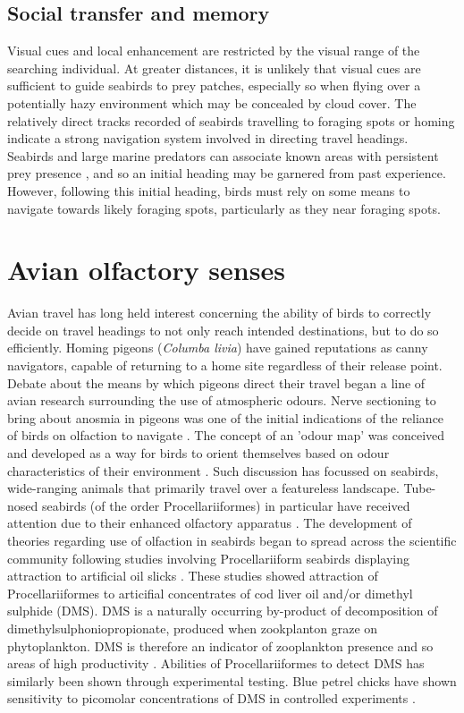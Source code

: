 \documentclass[9pt,twocolumn,twoside,lineno]{pnas-new}
\begin{document}
\subsection{Social transfer and memory}
Visual cues and local enhancement are restricted by the visual range of the searching individual. At greater distances, it is unlikely that visual cues are sufficient to guide seabirds to prey patches, especially so when flying over a potentially hazy environment which may be concealed by cloud cover. The relatively direct tracks recorded of seabirds travelling to foraging spots or homing \citep{Weimerskirch_2007b,Pollonara_2015} indicate a strong navigation system involved in directing travel headings. Seabirds and large marine predators can associate known areas with persistent prey presence \citep{Davoren_2013}, and so an initial heading may be garnered from past experience. However, following this initial heading, birds must rely on some means to navigate towards likely foraging spots, particularly as they near foraging spots.

\section{Avian olfactory senses}
Avian travel has long held interest concerning the ability of birds to correctly decide on travel headings to not only reach intended destinations, but to do so efficiently. Homing pigeons (\textit{Columba livia}) have gained reputations as canny navigators, capable of returning to a home site regardless of their release point. Debate about the means by which pigeons direct their travel began a line of avian research surrounding the use of atmospheric odours. Nerve sectioning to bring about anosmia in pigeons was one of the initial indications of the reliance of birds on olfaction to navigate \citep{Papi_1972}. The concept of an 'odour map' was conceived and developed as a way for birds to orient themselves based on odour characteristics of their environment \citep{Papi_1972,Bonadonna_2003}. Such discussion has focussed on seabirds, wide-ranging animals that primarily travel over a featureless landscape. Tube-nosed seabirds (of the order Procellariiformes) in particular have received attention due to their enhanced olfactory apparatus \citep{Bang_1960, Bang_1971, Jacobs_2012}. The development of theories regarding use of olfaction in seabirds began to spread across the scientific community following studies involving Procellariiform seabirds displaying attraction to artificial oil slicks \citep{Grubb_1972,Dell_Ariccia_2014,Nevitt_1995,Nevitt_1999,Nevitt_2000}. These studies showed attraction of Procellariiformes to articifial concentrates of cod liver oil and/or dimethyl sulphide (DMS). DMS is a naturally occurring by-product of decomposition of dimethylsulphoniopropionate, produced when zookplanton graze on phytoplankton. DMS is therefore an indicator of zooplankton presence and so areas of high productivity \citep{Cantin_1996,Dacey_1986,Jean_2009,Sim__2001}. Abilities of Procellariiformes to detect DMS has similarly been shown through experimental testing. Blue petrel chicks have shown sensitivity to picomolar concentrations of DMS in controlled experiments \citep{Bonadonna_2006}.
\end{document}
